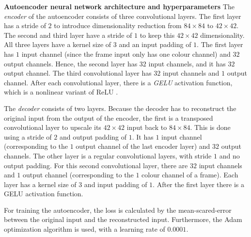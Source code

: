 \noindent \textbf{Autoencoder neural network architecture and hyperparameters}
\noindent The \emph{encoder} of the autoencoder consists of three convolutional layers. The first layer has a stride of $2$ to introduce dimensionality reduction from $84 \times 84$ to $42 \times 42$. The second and third layer have a stride of $1$ to keep this $42 \times 42$ dimensionality. All three layers have a kernel size of $3$ and an input padding of $1$. The first layer has $1$ input channel (since the frame input only has one colour channel) and $32$ output channels. Hence, the second layer has $32$ input channels, and it has $32$ output channel. The third convolutional layer has $32$ input channels and $1$ output channel. After each convolutional layer, there is a \emph{GELU} activation function, which is a nonlinear variant of ReLU \cite{gelu}.

The \emph{decoder} consists of two layers. Because the decoder has to reconstruct the original input from the output of the encoder, the first is a transposed convolutional layer to upscale its $42 \times 42$ input back to $84 \times 84$. This is done using a stride of $2$ and output padding of $1$. It has $1$ input channel (corresponding to the $1$ output channel of the last encoder layer) and $32$ output channels. The other layer is a regular convolutional layers, with stride $1$ and no output padding. For this second convolutional layer, there are $32$ input channels and $1$ output channel (corresponding to the $1$ colour channel of a frame). Each layer has a kernel size of $3$ and input padding of $1$. After the first layer there is a GELU activation function.

For training the autoencoder, the loss is calculated by the mean-scared-error between the original input and the reconstructed input. Furthermore, the Adam optimization algorithm is used, with a learning rate of $0.0001$. 
